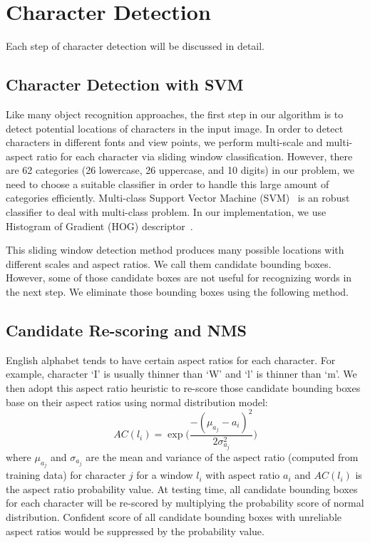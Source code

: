 \documentclass[10pt,twocolumn,letterpaper]{article}
\begin{document}
\section{Character Detection}

Each step of character detection will be discussed in detail.

\subsection{Character Detection with SVM}

Like many object recognition approaches, the first step in our algorithm is to detect potential locations of characters in the input image. In order to detect characters in different fonts and view points, we perform multi-scale and multi-aspect ratio for each character via sliding window classification. However, there are 62 categories (26 lowercase, 26 uppercase, and 10 digits) in our problem, we need to choose a suitable classifier in order to handle this large amount of categories efficiently. Multi-class Support Vector Machine (SVM)~\cite{122} is an robust classifier to deal with multi-class problem. In our implementation, we use Histogram of Gradient (HOG) descriptor~\cite{115}.

This sliding window detection method produces many possible locations with different scales and aspect ratios. We call them candidate bounding boxes. However, some of those candidate boxes are not useful for recognizing words in the next step. We eliminate those bounding boxes using the following method.

\subsection{Candidate Re-scoring and NMS}

English alphabet tends to have certain aspect ratios for each character. For example, character `I' is usually thinner than `W' and `l' is thinner than `m'. We then adopt this aspect ratio heuristic to re-score those candidate bounding boxes base on their aspect ratios using normal distribution model:
\[
AC(l_i) = \exp \Bigg( \frac{-(\mu_{a_j} - a_i)^2}{2\sigma_{a_j}^2} \Bigg)
\]
where $\mu_{a_j}$ and $\sigma_{a_j}$ are the mean and variance of the aspect ratio (computed from training data) for character $j$ for a window $l_i$ with aspect ratio $a_i$ and $AC(l_i)$ is the aspect ratio probability value. At testing time, all candidate bounding boxes for each character will be re-scored by multiplying the probability score of normal distribution. Confident score of all candidate bounding boxes with unreliable aspect ratios would be suppressed by the probability value.
\end{document}
